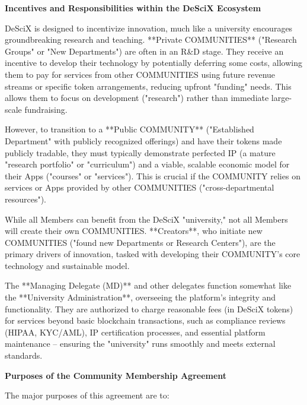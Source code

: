 \documentclass{article}
\begin{document}
\textbf{Incentives and Responsibilities within the DeSciX Ecosystem}

DeSciX is designed to incentivize innovation, much like a university encourages groundbreaking research and teaching. **Private COMMUNITIES** ("Research Groups" or "New Departments") are often in an R\&D stage. They receive an incentive to develop their technology by potentially deferring some costs, allowing them to pay for services from other COMMUNITIES using future revenue streams or specific token arrangements, reducing upfront "funding" needs. This allows them to focus on development ("research") rather than immediate large-scale fundraising.

However, to transition to a **Public COMMUNITY** ("Established Department" with publicly recognized offerings) and have their tokens made publicly tradable, they must typically demonstrate perfected IP (a mature "research portfolio" or "curriculum") and a viable, scalable economic model for their Apps ("courses" or "services"). This is crucial if the COMMUNITY relies on services or Apps provided by other COMMUNITIES ("cross-departmental resources").

While all Members can benefit from the DeSciX "university," not all Members will create their own COMMUNITIES. **Creators**, who initiate new COMMUNITIES ("found new Departments or Research Centers"), are the primary drivers of innovation, tasked with developing their COMMUNITY's core technology and sustainable model.

The **Managing Delegate (MD)** and other delegates function somewhat like the **University Administration**, overseeing the platform's integrity and functionality. They are authorized to charge reasonable fees (in DeSciX tokens) for services beyond basic blockchain transactions, such as compliance reviews (HIPAA, KYC/AML), IP certification processes, and essential platform maintenance – ensuring the "university" runs smoothly and meets external standards.

\textbf{Purposes of the Community Membership Agreement}

The major purposes of this agreement are to:
\end{document}
